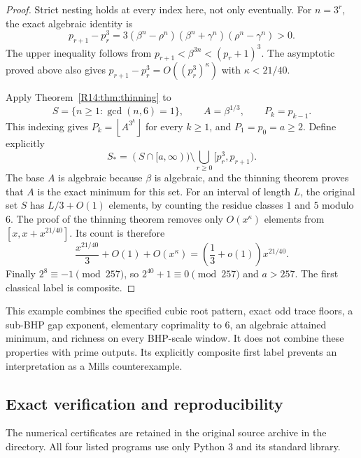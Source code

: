 \documentclass[11pt,a4paper]{article}
\theoremstyle{definition}\newtheorem{definition}[theorem]{Definition}
\theoremstyle{remark}\newtheorem{remark}[theorem]{Remark}
\newcommand{\floor}[1]{\left\lfloor#1\right\rfloor}
\begin{document}
\begin{proof}
Strict nesting holds at every index here, not only eventually.
For $n=3^r$, the exact algebraic identity is
\begin{equation}\label{R14:eq:wheel-gap}
 p_{r+1}-p_r^3
 =3(\beta^n-\rho^n)(\beta^n+\gamma^n)(\rho^n-\gamma^n)>0.
\end{equation}
The upper inequality follows from
$p_{r+1}<\beta^{3n}<(p_r+1)^3$. The asymptotic proved above also
gives $p_{r+1}-p_r^3=O((p_r^3)^\kappa)$ with
$\kappa<21/40$.

Apply Theorem~\ref{R14:thm:thinning} to
\[
 S=\{n\ge1:\gcd(n,6)=1\},\qquad
 A=\beta^{1/3},\qquad P_k=p_{k-1}.
\]
This indexing gives
$P_k=\floor{A^{3^k}}$ for every $k\ge1$, and
$P_1=p_0=a\ge2$. Define explicitly
\begin{equation}\label{R14:eq:wheel-set}
 S_\ast=(S\cap[a,\infty))
 \setminus\bigcup_{r\ge0}[p_r^3,p_{r+1}).
\end{equation}
The base $A$ is algebraic because $\beta$ is algebraic, and the
thinning theorem proves that $A$ is the exact minimum for this
set. For an interval of length $L$, the original set $S$ has
$L/3+O(1)$ elements, by counting the residue classes $1$ and $5$
modulo $6$. The proof of the thinning theorem removes only
$O(x^\kappa)$ elements from $[x,x+x^{21/40}]$. Its count is
therefore
\[
 \frac{x^{21/40}}3+O(1)+O(x^\kappa)
 =\left(\frac13+o(1)\right)x^{21/40}.
\]
Finally $2^8\equiv-1\pmod{257}$, so
$2^{40}+1\equiv0\pmod{257}$ and $a>257$. The first classical
label is composite.
\end{proof}

This example combines the specified cubic root pattern, exact
odd trace floors, a sub-BHP gap exponent, elementary coprimality
to $6$, an algebraic attained minimum, and richness on every
BHP-scale window. It does not combine these properties with prime
outputs. Its explicitly composite first label prevents an
interpretation as a Mills counterexample.

\subsection{Exact verification and reproducibility}\label{R14:sec:verification}

The numerical certificates are retained in the original source archive in the
 directory. All four listed programs use only
Python 3 and its standard library.
\end{document}
